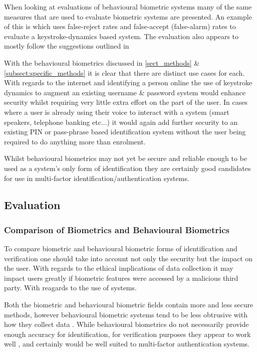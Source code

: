 \documentclass[12pt]{article}
\begin{document}
	When looking at evaluations of behavioural biometric systems many of the same measures that are used to evaluate biometric systems are presented. An example of this is \cite{typing_auth2005} which uses false-reject rates and false-accept (false-alarm) rates to evaluate a keystroke-dynamics based system. The evaluation also appears to mostly follow the suggestions outlined in \cite{phillips_evaluating_biometric_systems2000} 
	
	With the behavioural biometrics discussed in \ref{sect_methods} \& \ref{subsect:specific_methods} it is clear that there are distinct use cases for each. With regards to the internet and identifying a person online the use of keystroke dynamics to augment an existing username \& password system would enhance security whilst requiring very little extra effort on the part of the user. In cases where a user is already using their voice to interact with a system (smart speakers, telephone banking etc...) it would again add further security to an existing PIN or pass-phrase based identification system without the user being required to do anything more than enrolment.
	
	Whilst behavioural biometrics may not yet be secure and reliable enough to be used as a system's only form of identification they are certainly good candidates for use in multi-factor identification/authentication systems.
	
	\subsection{Evaluation}
	\subsubsection{Comparison of Biometrics and Behavioural Biometrics}
	\label{subsubsect:biometric_behavioural_comparison}
	To compare biometric and behavioural biometric forms of identification and verification one should take into account not only the security but the impact on the user. With regards to the ethical implications of data collection it may impact users greatly if biometric features were accessed by a malicious third party. With reagards to the use of systems.
	
	Both the biometric and behavioural biometric fields contain more and less secure methods, however behavioural biometric systems tend to be less obtrusive with how they collect data \citep{yampolskiy2008behavioural}. While behavioural biometrics do not necessarily provide enough accuracy for identification, for verification purposes they appear to work well \citep{yampolskiy2008behavioural}, and certainly would be well suited to multi-factor authentication systems.
	
\end{document}
